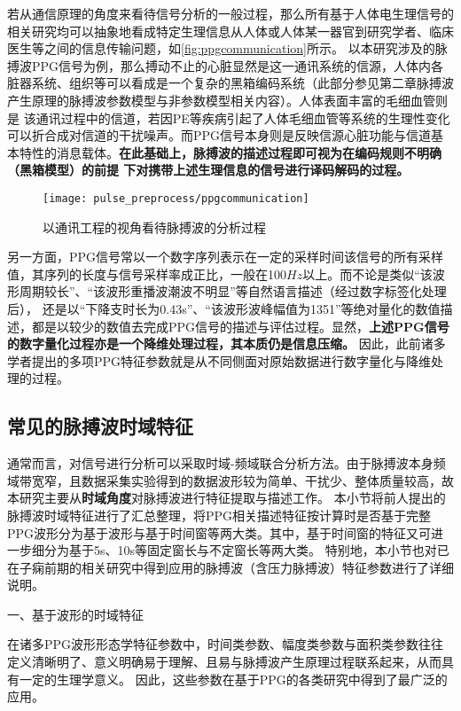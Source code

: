 若从通信原理的角度来看待信号分析的一般过程，那么所有基于人体电生理信号的相关研究均可以抽象地看成特定生理信息从人体或人体某一器官到研究学者、临床医生等之间的信息传输问题，如\autoref{fig:ppgcommunication}所示。
以本研究涉及的脉搏波PPG信号为例，那么搏动不止的心脏显然是这一通讯系统的信源，人体内各脏器系统、组织等可以看成是一个复杂的黑箱编码系统（此部分参见第二章脉搏波产生原理的脉搏波参数模型与非参数模型相关内容）。人体表面丰富的毛细血管则是
该通讯过程中的信道，若因PE等疾病引起了人体毛细血管等系统的生理性变化可以折合成对信道的干扰噪声。而PPG信号本身则是反映信源心脏功能与信道基本特性的消息载体。\textbf{在此基础上，脉搏波的描述过程即可视为在编码规则不明确（黑箱模型）的前提
下对携带上述生理信息的信号进行译码解码的过程。}
\begin{figure}[htbp]
    \centering
    \texttt{[image: pulse\_preprocess/ppgcommunication]}
    \caption{\label{fig:ppgcommunication}以通讯工程的视角看待脉搏波的分析过程}
\end{figure}

另一方面，PPG信号常以一个数字序列表示在一定的采样时间该信号的所有采样值，其序列的长度与信号采样率成正比，一般在100$Hz$以上。而不论是类似“该波形周期较长”、“该波形重播波潮波不明显”等自然语言描述（经过数字标签化处理后），
还是以“下降支时长为0.43s”、“该波形波峰幅值为1351”等绝对量化的数值描述，都是以较少的数值去完成PPG信号的描述与评估过程。显然，\textbf{上述PPG信号的数字量化过程亦是一个降维处理过程，其本质仍是信息压缩。}
因此，此前诸多学者提出的多项PPG特征参数就是从不同侧面对原始数据进行数字量化与降维处理的过程。

\subsection{常见的脉搏波时域特征}
通常而言，对信号进行分析可以采取时域-频域联合分析方法。由于脉搏波本身频域带宽窄，且数据采集实验得到的数据波形较为简单、干扰少、整体质量较高，故本研究主要从\textbf{时域角度}对脉搏波进行特征提取与描述工作。
本小节将前人提出的脉搏波时域特征进行了汇总整理，将PPG相关描述特征按计算时是否基于完整PPG波形分为基于波形与基于时间窗等两大类。其中，基于时间窗的特征又可进一步细分为基于5s、10s等固定窗长与不定窗长等两大类。
特别地，本小节也对已在子痫前期的相关研究中得到应用的脉搏波（含压力脉搏波）特征参数进行了详细说明。

一、基于波形的时域特征

在诸多PPG波形形态学特征参数中，时间类参数、幅度类参数与面积类参数往往定义清晰明了、意义明确易于理解、且易与脉搏波产生原理过程联系起来，从而具有一定的生理学意义。
因此，这些参数在基于PPG的各类研究中得到了最广泛的应用\cite{cwl,mmt}。


